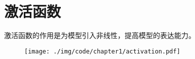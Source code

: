 \section{激活函数}

激活函数的作用是为模型引入非线性，提高模型的表达能力。
\begin{figure}[h]
	\centering
	\texttt{[image: ./img/code/chapter1/activation.pdf]}
\end{figure}
